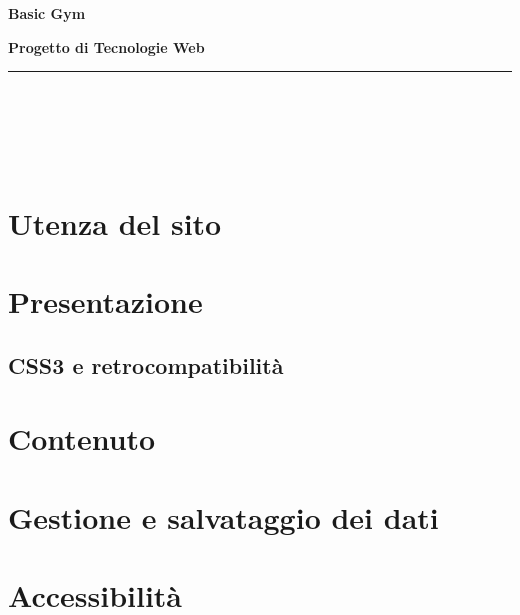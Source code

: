 \documentclass[12pt,a4paper]{article}
\title{\titoloDocumento}
\author{Anna Bonaldo}
\newcommand{\titoloDocumento}{Basic Gym}
\begin{document}
\begin{center}
	\[  \]
	\[  \]
	\[  \]
	\[  \]
	\[  \]

	\vspace{1cm}
	\begin{Huge}
		\textbf{{\titoloDocumento}}\\
		\vspace{0.5cm}
	\end{Huge}
	\begin{Large}
		\textbf{Progetto di Tecnologie Web}\\
		
	\end{Large}
	\vspace{1cm}

 \hrule
 \vspace{1cm}
	\LBmat{} \\
	\TFmat{}\\
     \ABmat{}\\
     \ECmat{}\\
    \vspace{1cm}
   

\end{center}
\newpage
\vspace{1cm}



\begin{abstract}

\end{abstract}
	\newpage
	\tableofcontents
	
	\newpage
\section{Utenza del sito}
\section{Presentazione}
\subsection{CSS3 e retrocompatibilità}
\section{Contenuto}
\section{Gestione e salvataggio dei dati}
\section{Accessibilità}
\end{document}
